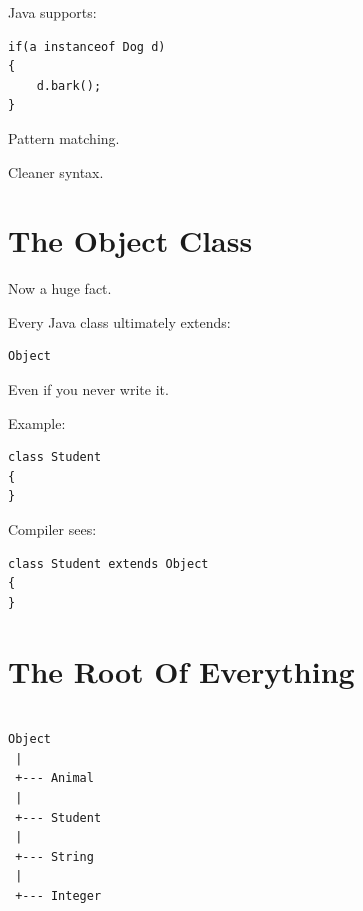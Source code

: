 \documentclass[11pt,a4paper]{book}
\begin{document}
Java supports:

\begin{verbatim}
if(a instanceof Dog d)
{
    d.bark();
}
\end{verbatim}


Pattern matching.

Cleaner syntax.


\section{The Object Class}

Now a huge fact.


Every Java class ultimately extends:

\begin{verbatim}
Object
\end{verbatim}


Even if you never write it.


Example:

\begin{verbatim}
class Student
{
}
\end{verbatim}


Compiler sees:

\begin{verbatim}
class Student extends Object
{
}
\end{verbatim}


\section{The Root Of Everything}

\begin{verbatim}

Object
 |
 +--- Animal
 |
 +--- Student
 |
 +--- String
 |
 +--- Integer

\end{verbatim}
\end{document}
